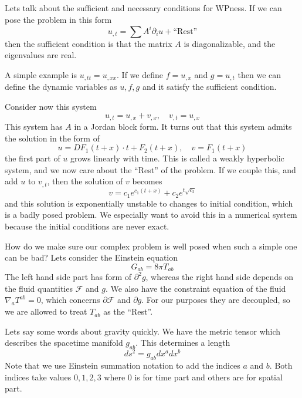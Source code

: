 \documentclass[letterpaper, 11pt]{article}
\numberwithin{equation}{section}
\numberwithin{figure}{section}
\begin{document}
Lets talk about the sufficient and necessary conditions for WPness. If we can
pose the problem in this form
\begin{equation}
  \label{eq:2}
  u_{,t} = \sum A^i\partial_iu + \text{``Rest''}
\end{equation}
then the sufficient condition is that the matrix $A$ is diagonalizable, and the
eigenvalues are real.

A simple example is $u_{,tt} = u_{,xx}$. If we define $f = u_{,x}$ and $g =
u_{,t}$ then we can define the dynamic variables as $u, f, g$ and it satisfy the
sufficient condition.

Consider now this system
\begin{equation}
  \label{eq:3}
  u_{,t} = u_{,x} + v_{,x},\quad v_{,t} = u_{,x}
\end{equation}
This system has $A$ in a Jordan block form. It turns out that this system admits
the solution in the form of
\begin{equation}
  \label{eq:4}
  u = DF_1(t + x)\cdot t + F_2(t + x),\quad v = F_1(t + x)
\end{equation}
the first part of $u$ grows linearly with time. This is called a weakly
hyperbolic system, and we now care about the ``Rest'' of the problem. If we
couple this, and add $u$ to $v_{,t}$, then the solution of $v$ becomes
\begin{equation}
  \label{eq:5}
  v = c_1e^{c_1(t+x)} + c_2e^{t\sqrt{c_2}}
\end{equation}
and this solution is exponentially unstable to changes to initial condition,
which is a badly posed problem. We especially want to avoid this in a numerical
system because the initial conditions are never exact.

How do we make sure our complex problem is well posed when such a simple one can
be bad? Lets consider the Einstein equation
\begin{equation}
  \label{eq:6}
  G_{ab} = 8\pi T_{ab}
\end{equation}
The left hand side part has form of $\partial^{2}g$, whereas the right hand side
depends on the fluid quantities $\mathcal{F}$ and $g$. We also have the
constraint equation of the fluid $\nabla_aT^{ab} = 0$, which concerns $\partial
\mathcal{F}$ and $\partial g$. For our purposes they are decoupled, so we are
allowed to treat $T_{ab}$ as the ``Rest''.

Lets say some words about gravity quickly. We have the metric tensor which
describes the spacetime manifold $g_{ab}$. This determines a length
\begin{equation}
  \label{eq:7}
  ds^2 = g_{ab}dx^adx^{b}
\end{equation}
Note that we use Einstein summation notation to add the indices $a$ and $b$.
Both indices take values $0, 1, 2, 3$ where $0$ is for time part and others are
for spatial part.
\end{document}

